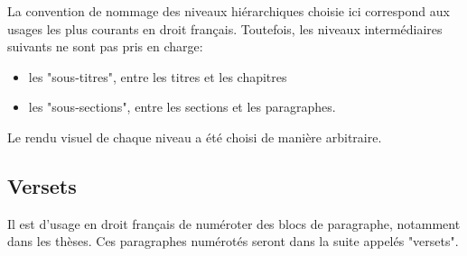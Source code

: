 \documentclass{ltxdockit}
\begin{document}
La convention de nommage des niveaux hiérarchiques choisie ici correspond aux usages les plus courants en droit français. Toutefois, les niveaux intermédiaires suivants ne sont pas pris en charge:
\begin{itemize}
\item les "sous-titres", entre les titres et les chapitres
\item les "sous-sections", entre les sections et les paragraphes.
\end{itemize}
Le rendu visuel de chaque niveau a été choisi de manière arbitraire.

\subsection{Versets}
\label{versets}

Il est d'usage en droit français de numéroter des blocs de paragraphe, notamment dans les thèses. Ces paragraphes numérotés seront dans la suite appelés "versets".
\end{document}
